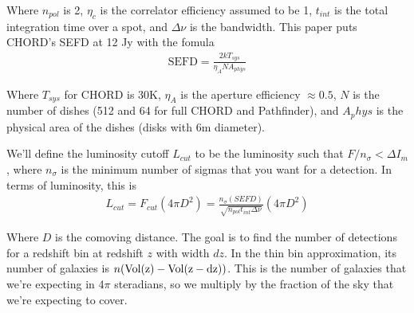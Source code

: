 \documentclass{article}
\begin{document}
Where $n_{pol}$ is 2, $\eta_c$ is the correlator efficiency assumed to be 1, $t_{int}$ is the total integration time over a spot, and $\Delta \nu$ is the bandwidth. This paper \cite{mackay2023lowcost} puts CHORD's SEFD at 12 Jy with the fomula
\begin{align*}
    \text{SEFD} = \frac{2k T_{sys}}{\eta_A N A_{phys}}
\end{align*}

Where $T_{sys}$ for CHORD is 30K, $\eta_A$ is the aperture efficiency $\approx 0.5$, $N$ is the number of dishes (512 and 64 for full CHORD and Pathfinder), and $A_phys$ is the physical area of the dishes (disks with 6m diameter).

We'll define the luminosity cutoff $L_{cut}$ to be the luminosity such that $F/n_\sigma < \Delta I_m$, where $n_\sigma$ is the minimum number of sigmas that you want for a detection. In terms of luminosity, this is
\begin{align*}
    L_{cut} = F_{cut} (4\pi D^2) = \frac{n_\sigma(SEFD)}{\sqrt{n_{pol} t_{int} \Delta \nu}}(4\pi D^2)
\end{align*}

Where $D$ is the comoving distance. The goal is to find the number of detections for a redshift bin at redshift $z$ with width $dz$. In the thin bin approximation, its number of galaxies is $n (\rm{Vol}(z)-\rm{Vol}(z-dz))$. This is the number of galaxies that we're expecting in 4$\pi$ steradians, so we multiply by the fraction of the sky that we're expecting to cover.

\newpage

\printbibliography
\end{document}
